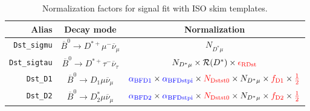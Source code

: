 \begin{landscape}
\begin{table}
\centering
\caption{
    Normalization factors for \Dstar signal fit with ISO skim templates.
}
\label{tab:fit-norm-fact-dst}
\scriptsize

\begin{tabular}{r|c|c}
\toprule
        \textbf{Alias} &                                \textbf{Decay mode}                                &                                                                                                                                                                                   \textbf{Normalization}                                                                                                                                                                                   \\
\midrule
   \texttt{Dst\_sigmu} &           $\overline{B}^0 \rightarrow D^{*+} \mu^- \overline{\nu}_\mu$            &                                                                                                                                                                                       $N_{D^* \mu}$                                                                                                                                                                                        \\
  \texttt{Dst\_sigtau} &          $\overline{B}^0 \rightarrow D^{*+} \tau^- \overline{\nu}_\tau$           &                                                                                                                                                     $N_{D^* \mu} \times \mathcal{R}(D^*) \times \textcolor{red}{\epsilon_\text{RDst}}$                                                                                                                                                     \\
      \texttt{Dst\_D1} &              $\overline{B}^0 \rightarrow D_1 \mu \overline{\nu}_\mu$              &                                                                                  $\textcolor{blue}{\alpha_\text{BFD1}} \times \textcolor{blue}{\alpha_\text{BFDstpi}} \times \textcolor{red}{N_\text{Dstst0}} \times N_{D^* \mu} \times \textcolor{red}{f_\text{D1}} \times \textcolor{red}{\frac{1}{2}}$                                                                                  \\
      \texttt{Dst\_D2} &             $\overline{B}^0 \rightarrow D^*_2 \mu \overline{\nu}_\mu$             &                                                                                  $\textcolor{blue}{\alpha_\text{BFD2}} \times \textcolor{blue}{\alpha_\text{BFDstpi}} \times \textcolor{red}{N_\text{Dstst0}} \times N_{D^* \mu} \times \textcolor{red}{f_\text{D2}} \times \textcolor{red}{\frac{1}{2}}$                                                                                  \\

\end{tabular}
\end{table}
\end{landscape}
